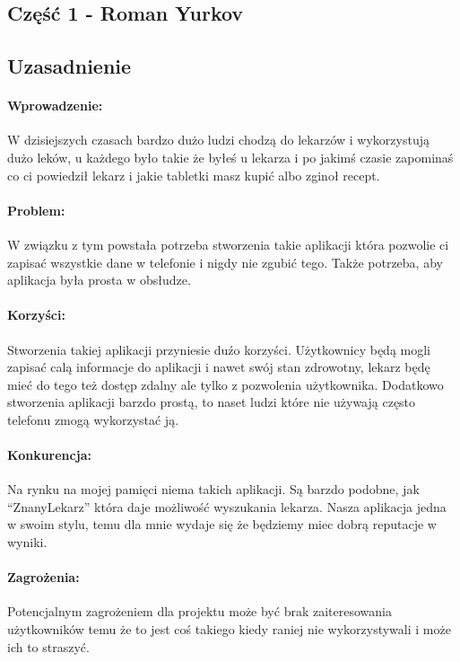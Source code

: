 \begin{center}
  \section{Część 1 - Roman Yurkov}
  \subsection{Uzasadnienie}
\end{center}

\paragraph{Wprowadzenie:} W dzisiejszych czasach bardzo dużo ludzi chodzą do lekarzów i wykorzystują dużo leków, u każdego było takie że byłeś u lekarza i po jakimś czasie zapominaś co ci powiedził lekarz i jakie tabletki masz kupić albo zginoł recept.

\paragraph{Problem:} W związku z tym powstała potrzeba stworzenia takie aplikacji która pozwolie ci zapisać wszystkie dane w telefonie i nigdy nie zgubić tego. Także potrzeba, aby aplikacja była prosta w obsłudze.

\paragraph{Korzyści:} Stworzenia takiej aplikacji przyniesie duźo korzyści. Użytkownicy będą mogli zapisać calą informacje do aplikacji i nawet swój stan zdrowotny, lekarz będę mieć do tego też dostęp zdalny ale tylko z pozwolenia użytkownika. Dodatkowo stworzenia aplikacji barzdo prostą, to naset ludzi które nie używają często telefonu zmogą wykorzystać ją.

\paragraph{Konkurencja:} Na rynku na mojej pamięci niema takich aplikacji. Są barzdo podobne, jak “ZnanyLekarz” która daje możliwość wyszukania lekarza. Nasza aplikacja jedna w swoim stylu, temu dla mnie wydaje się że będziemy miec dobrą reputacje w wyniki.

\paragraph{Zagrożenia:} Potencjalnym zagrożeniem dla projektu może być brak zaiteresowania użytkowników temu że to jest coś takiego kiedy raniej nie wykorzystywali i może ich to straszyć.

